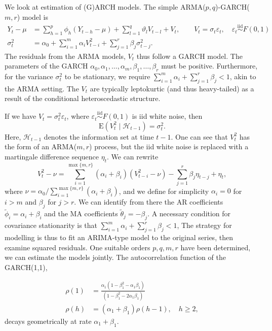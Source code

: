 \documentclass[]{book}
\begin{document}
We look at estimation of (G)ARCH models. The simple
ARMA(\(p, q\))-GARCH(\(m, r\)) model is \[
\begin{align*}
Y_t -\mu &=   \sum_{h = 1}^p \phi_h (Y_{t-h}-\mu)+ \sum_{l = 1}^q \vartheta_lV_{t-l}+ V_t, \qquad V_t = \sigma_t\varepsilon_t, \quad\varepsilon_t\stackrel{\mathrm{iid}}{\sim} F(0, 1) \\ \sigma^2_t &= \alpha_0+\sum_{i = 1}^m \alpha_iV_{t-i}^2 + \sum_{j = 1}^r \beta_j\sigma^2_{t-j}. 
\end{align*}
\] The residuals from the ARMA models, \(V_t\) thus follow a GARCH
model. The parameters of the GARCH
\(\alpha_0, \alpha_1, \ldots, \alpha_m, \beta_1, \ldots, \beta_r\) must
be positive. Furthermore, for the variance \(\sigma^2_t\) to be
stationary, we require
\(\sum_{i=1}^m \alpha_i + \sum_{j=1}^r \beta_j <1\), akin to the ARMA
setting. The \(V_t\) are typically leptokurtic (and thus heavy-tailed)
as a result of the conditional heteroscedastic structure.

If we have \(V_t=\sigma_t^2\varepsilon_t\), where
\(\varepsilon_t \stackrel{\mathrm{iid}}{\sim}F(0, 1)\) is iid white
noise, then \[\mathrm{E}(V_t^2 \mid \mathcal{H}_{t-1}) = \sigma^2_t.\]
Here, \(\mathcal{H}_{t-1}\) denotes the information set at time \(t-1\).
One can see that \(V_t^2\) has the form of an ARMA(\(m, r\)) process,
but the iid white noise is replaced with a martingale difference
sequence \(\eta_t\). We can rewrite
\[V_t^2 -\nu = \sum_{i=1}^{\max\{m, r\}} (\alpha_i+\beta_i)(V_{t-i}^2-\nu) - \sum_{j=1}^r \beta_j \eta_{t-j} + \eta_t,\]
where \(\nu = \alpha_0/ \sum_{i=1}^{\max\{m, r\}}(\alpha_i+\beta_i)\),
and we define for simplicity \(\alpha_i=0\) for \(i>m\) and \(\beta_j\)
for \(j>r\). We can identify from there the AR coefficients
\(\tilde{\phi}_i=\alpha_i+\beta_i\) and the MA coefficients
\(\tilde{\theta}_j=-\beta_j\). A necessary condition for covariance
stationarity is that
\(\sum_{i=1}^m \alpha_i + \sum_{j=1}^r \beta_j <1\), The strategy for
modelling is thus to fit an ARIMA-type model to the original series,
then examine squared residuals. One suitable orders \(p, q, m, r\) have
been determined, we can estimate the models jointly. The autocorrelation
function of the GARCH(1,1),

\[
\begin{align}
  \rho(1) &= \frac{\alpha_1(1-\beta_1^2-\alpha_1\beta_1)}{(1-\beta_1^2-2\alpha_1\beta_1)} \\
  \rho(h) &= (\alpha_1+\beta_1)\rho(h-1), \quad h \geq 2,
\end{align}
\] decays geometrically at rate \(\alpha_1+\beta_1\).
\end{document}
